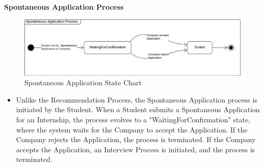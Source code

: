 \noindent\textbf{Spontaneous Application Process}\\
\begin{figure}[ht]
    \centering
    \includegraphics[width=1 \textwidth]{Diagrams/StateCharts/SpontaneousApplicationStateChart.png}
    \caption{Spontaneous Application State Chart}
    \label{fig:SpontaneousApplication}
\end{figure}
\begin{itemize}
    \item Unlike the Recommendation Process, the Spontaneous Application process is initiated by the Student. When a Student submits a Spontaneous Application for an Internship, the process evolves to a "WaitingForConfirmation" state, where the system waits for the Company to accept the Application. If the Company rejects the Application, the process is terminated. If the Company accepts the Application, an Interview Process is initiated, and the process is terminated.
\end{itemize} 


